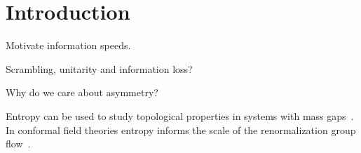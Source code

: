 \section{Introduction} \label{sec:intro}

Motivate information speeds.

Scrambling, unitarity and information loss?

Why do we care about asymmetry?

Entropy can be used to study topological properties in systems with mass gaps~\cite{Kitaev2006}. In conformal field theories entropy informs the scale of the renormalization group flow~\cite{Casini2011, Myers2011}.
